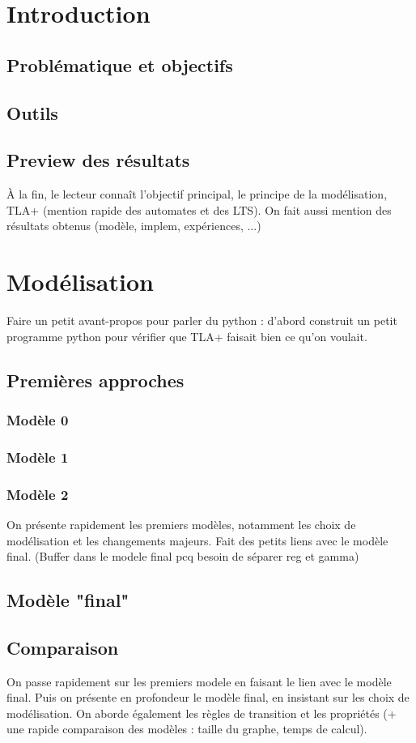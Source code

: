 \documentclass{article}
\begin{document}
\section{Introduction}
    \subsection{Problématique et objectifs}
    \subsection{Outils}
    \subsection{Preview des résultats}
    À la fin, le lecteur connaît l'objectif principal, le principe de la modélisation, TLA+ (mention rapide des 
    automates et des LTS). On fait aussi mention des résultats obtenus (modèle, implem, expériences, ...)

\section{Modélisation}
    Faire un petit avant-propos pour parler du python : d'abord construit un petit programme python pour vérifier que
    TLA+ faisait bien ce qu'on voulait.
    \subsection{Premières approches}
        \subsubsection{Modèle 0}
        \subsubsection{Modèle 1}
        \subsubsection{Modèle 2}
        On présente rapidement les premiers modèles, notamment les choix de modélisation et les changements majeurs. 
        Fait des petits liens avec le modèle final. (Buffer dans le modele final pcq besoin de séparer reg et gamma)
    \subsection{Modèle "final"}
    \subsection{Comparaison}
    On passe rapidement sur les premiers modele en faisant le lien avec le modèle final. Puis on présente en profondeur
    le modèle final, en insistant sur les choix de modélisation.
    On aborde également les règles de transition et les propriétés (+ une rapide
    comparaison des modèles : taille du graphe, temps de calcul).
\end{document}
